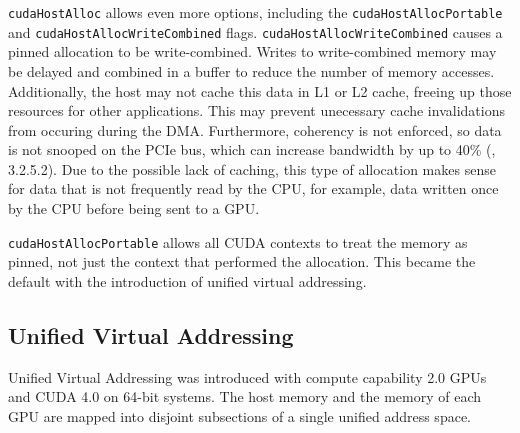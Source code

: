 \begin{sloppypar}
\texttt{cudaHostAlloc} allows even more options, including the \texttt{cudaHostAllocPortable} and \texttt{cudaHostAllocWriteCombined} flags.
\texttt{cudaHostAllocWriteCombined} causes a pinned allocation to be write-combined.
Writes to write-combined memory may be delayed and combined in a buffer to reduce the number of memory accesses.
Additionally, the host may not cache this data in L1 or L2 cache, freeing up those resources for other applications.
This may prevent unecessary cache invalidations from occuring during the DMA.
Furthermore, coherency is not enforced, so data is not snooped on the PCIe bus, which can increase bandwidth by up to 40\% (\cite{nvidia2010cuda30}, 3.2.5.2).
Due to the possible lack of caching, this type of allocation makes sense for data that is not frequently read by the CPU, for example, data written once by the CPU before being sent to a GPU.
\end{sloppypar}


\texttt{cudaHostAllocPortable} allows all CUDA contexts to treat the memory as pinned, not just the context that performed the allocation.
This became the default with the introduction of unified virtual addressing.

\subsection{Unified Virtual Addressing}
\label{sec:uva}

Unified Virtual Addressing was introduced with compute capability 2.0 GPUs and CUDA 4.0 on 64-bit systems.
The host memory and the memory of each GPU are mapped into disjoint subsections of a single unified address space.

